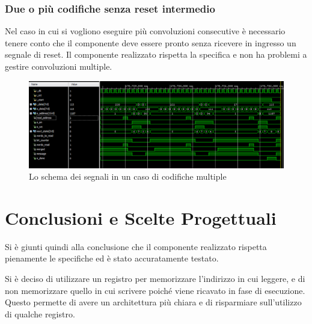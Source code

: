 \subsubsection{Due o più codifiche senza reset intermedio}
Nel caso in cui si vogliono eseguire più convoluzioni consecutive è necessario tenere conto che il componente deve essere pronto senza ricevere in ingresso un segnale di reset. Il componente realizzato rispetta la specifica e non ha problemi a gestire convoluzioni multiple.
\begin{figure}[!htb]
    \includegraphics[keepaspectratio=true,scale=0.5]{images/Capitolo3/noreset.PNG}
    \caption{Lo schema dei segnali in un caso di codifiche multiple}
    \label{fig:signal3}
\end{figure}

\section{Conclusioni e Scelte Progettuali}
Si è giunti quindi alla conclusione che il componente realizzato rispetta pienamente le specifiche ed è stato accuratamente testato.

Si è deciso di utilizzare un registro per memorizzare l’indirizzo in cui leggere, e di non memorizzare quello in cui scrivere poiché viene ricavato in fase di esecuzione. Questo permette di avere un architettura più chiara e di risparmiare sull’utilizzo di qualche registro.